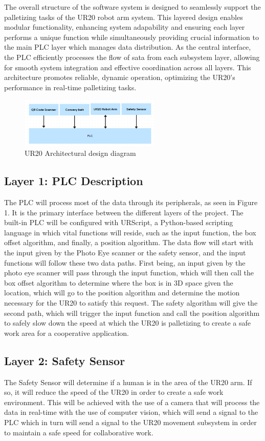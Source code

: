 The overall structure of the software system is designed to seamlessly support the palletizing tasks of the UR20 robot arm system. This layered design enables modular functionality, enhancing system adapability and ensuring each layer performs a unique function while simultaneously providing crucial information to the main PLC layer which manages data distribution. As the central interface, the PLC efficiently processes the flow of sata from each subsystem layer, allowing for smooth system integration and effective coordination across all layers. This architecture promotes reliable, dynamic operation, optimizing the UR20's performance in real-time palletizing tasks.
\begin{figure}[h!]
	\centering
 	\includegraphics[width=0.60\textwidth]{images/layers}
 \caption{UR20 Architectural design diagram}
\end{figure}

\subsection{Layer 1: PLC Description}
The PLC will process most of the data through its peripherals, as seen in Figure 1. It is the primary interface between the different layers of the project. The built-in PLC will be configured with URScript, a Python-based scripting language in which vital functions will reside, such as the input function, the box offset algorithm, and finally, a position algorithm. The data flow will start with the input given by the Photo Eye scanner or the safety sensor, and the input functions will follow these two data paths. First being, an input given by the photo eye scanner will pass through the input function, which will then call the box offset algorithm to determine where the box is in 3D space given the location, which will go to the position algorithm and determine the motion necessary for the UR20 to satisfy this request. The safety algorithm will give the second path, which will trigger the input function and call the position algorithm to safely slow down the speed at which the UR20 is palletizing to create a safe work area for a cooperative application.

\subsection{Layer 2: Safety Sensor}
The Safety Sensor will determine if a human is in the area of the UR20 arm. If so, it will reduce the speed of the UR20 in order to create a safe work environment. This will be achieved with the use of a camera that will process the data in real-time with the use of computer vision, which will send a signal to the PLC which in turn will send a signal to the UR20 movement subsystem in order to maintain a safe speed for collaborative work.

